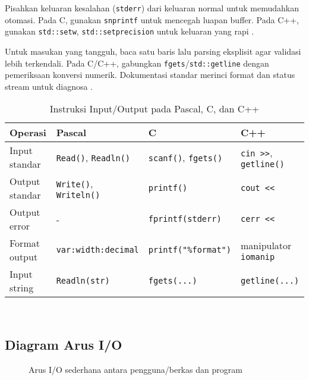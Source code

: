 \documentclass[../main.tex]{subfiles}
\begin{document}
Pisahkan keluaran kesalahan (\texttt{stderr}) dari keluaran normal untuk memudahkan otomasi. Pada C, gunakan \texttt{snprintf} untuk mencegah luapan buffer. Pada C++, gunakan \texttt{std::setw}, \texttt{std::setprecision} untuk keluaran yang rapi \parencite{gnu-c-manual,cpp-reference,cpp-iomanip}.

Untuk masukan yang tangguh, baca satu baris lalu parsing eksplisit agar validasi lebih terkendali. Pada C/C++, gabungkan \texttt{fgets}/\texttt{std::getline} dengan pemeriksaan konversi numerik. Dokumentasi standar merinci format dan status stream untuk diagnosa \parencite{iso-c-draft-n1570,cpp-reference}.


\begin{table}[H]
  \centering
  \small
  \caption{Instruksi Input/Output pada Pascal, C, dan C++}
  \begin{tabular}{@{}llll@{}}
    \toprule
    Operasi & Pascal & C & C++ \\
    \midrule
    Input standar & \texttt{Read()}, \texttt{Readln()} & \texttt{scanf()}, \texttt{fgets()} & \texttt{cin >>}, \texttt{getline()} \\
    Output standar & \texttt{Write()}, \texttt{Writeln()} & \texttt{printf()} & \texttt{cout <<} \\
    Output error & - & \texttt{fprintf(stderr)} & \texttt{cerr <<} \\
    Format output & \texttt{var:width:decimal} & \texttt{printf("\%format")} & manipulator \texttt{iomanip} \\
    Input string & \texttt{Readln(str)} & \texttt{fgets(...)} & \texttt{getline(...)} \\
    \bottomrule
  \end{tabular}
  \\\parencite{w3pascal-io,gnu-c-manual,cplusplus-io,cpp-iomanip}
\end{table}

\subsection{Diagram Arus I/O}
\begin{figure}[H]
  \centering
  \caption{Arus I/O sederhana antara pengguna/berkas dan program}
  \label{fig:io-flow}
\end{figure}
\end{document}
